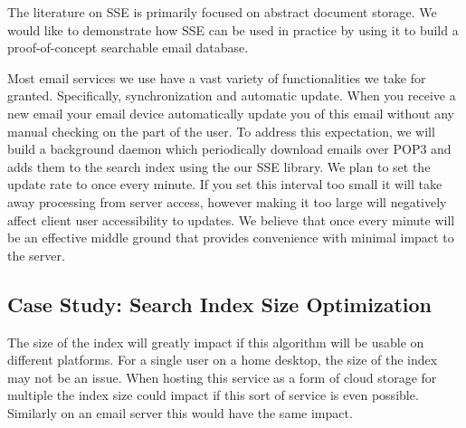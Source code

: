 \documentclass[onecolumn, draftclsnofoot,10pt, compsoc]{IEEEtran}
\begin{document}

The literature on SSE is primarily focused on abstract document storage. We would like to demonstrate how SSE can be used in practice by using it to build a proof-of-concept searchable email database.

Most email services we use have a vast variety of functionalities we take for granted.
Specifically, synchronization and automatic update.
When you receive a new email your email device automatically update you of this email without any manual checking on the part of the user. 
To address this expectation, we will build a background daemon which periodically download emails over POP3 and adds them to the search index using the our SSE library.
We plan to set the update rate to once every minute.
If you set this interval too small it will take away processing from server access, however making it too large will negatively affect client user accessibility to updates.
We believe that once every minute will be an effective middle ground that provides convenience with minimal impact to the server.

\subsection {Case Study: Search Index Size Optimization}
\label{subsec:size}


The size of the index will greatly impact if this algorithm will be usable on different platforms.
For a single user on a home desktop, the size of the index may not be an issue.
When hosting this service as a form of cloud storage for multiple the index size could impact if this sort of service is even possible.
Similarly on an email server this would have the same impact.
\end{document}
